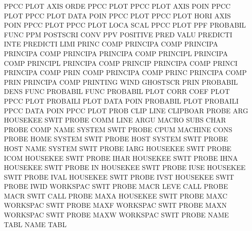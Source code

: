 PPCC     PLOT AXIS ORDE                 PPCC     PLOT
PPCC     PLOT AXIS POIN                 PPCC     PLOT
PPCC     PLOT DATA POIN                 PPCC     PLOT
PPCC     PLOT HORI AXIS POIN            PPCC     PLOT
PPCC     PLOT LOCA SCAL                 PPCC     PLOT
PPF                                     PROBABIL FUNC
PPM                                     POSTSCRI CONV
PPV                                     POSITIVE PRED VALU
PREDICTI INTE                           PREDICTI LIMI
PRINC    COMP                           PRINCIPA COMP
PRINCIPA                                PRINCIPA COMP
PRINCIPA                                PRINCIPA COMP
PRINCIPL                                PRINCIPA COMP
PRINCIPL                                PRINCIPA COMP
PRINCIP                                 PRINCIPA COMP
PRINCI                                  PRINCIPA COMP
PRIN     COMP                           PRINCIPA COMP
PRINC                                   PRINCIPA COMP
PRIN                                    PRINCIPA COMP
PRINTING WIND                           GHOSTSCR PRIN
PROBABIL DENS FUNC                      PROBABIL FUNC
PROBABIL PLOT CORR COEF PLOT            PPCC     PLOT
PROBAILI PLOT DATA POIN                 PROBABIL PLOT
PROBAILI PPCC DATA POIN                 PPCC     PLOT
PROB     CLIP LINE                      CLIPBOAR
PROBE    ARG                            HOUSEKEE SWIT
PROBE    COMM LINE ARGU                 MACRO    SUBS CHAR
PROBE    COMP NAME                      SYSTEM   SWIT
PROBE    CPUM                           MACHINE  CONS
PROBE    HOME                           SYSTEM   SWIT
PROBE    HOST                           SYSTEM   SWIT
PROBE    HOST NAME                      SYSTEM   SWIT
PROBE    IARG                           HOUSEKEE SWIT
PROBE    ICOM                           HOUSEKEE SWIT
PROBE    IHAR                           HOUSEKEE SWIT
PROBE    IHNA                           HOUSEKEE SWIT
PROBE    IN                             HOUSEKEE SWIT
PROBE    IUSE                           HOUSEKEE SWIT
PROBE    IVAL                           HOUSEKEE SWIT
PROBE    IVST                           HOUSEKEE SWIT
PROBE    IWID                           WORKSPAC SWIT
PROBE    MACR LEVE                      CALL
PROBE    MACR SWIT                      CALL
PROBE    MAXA                           HOUSEKEE SWIT
PROBE    MAXC                           WORKSPAC SWIT
PROBE    MAXF                           WORKSPAC SWIT
PROBE    MAXN                           WORKSPAC SWIT
PROBE    MAXW                           WORKSPAC SWIT
PROBE    NAME TABL                      NAME     TABL
